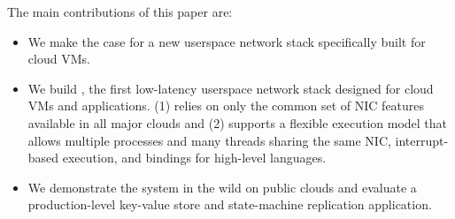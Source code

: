 The main contributions of this paper are:
\begin{itemize}
\item We make the case for a new userspace network stack specifically built for cloud VMs.
\item We build \mt{}, the first low-latency userspace network stack designed for cloud VMs and applications. \mt{} (1) relies on only the common set of NIC features available in all major clouds and (2) supports a flexible execution model that allows multiple processes and many threads sharing the same NIC, interrupt-based execution, and bindings for high-level languages.
\item We demonstrate the system in the wild on public clouds and evaluate a production-level key-value store and state-machine replication application. %
\end{itemize}






